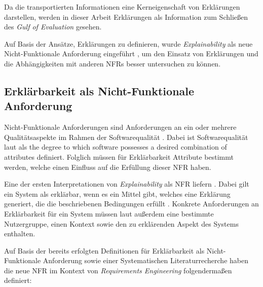 Da die transportierten Informationen eine Kerneigenschaft von Erklärungen darstellen, werden in dieser Arbeit Erklärungen als Information zum Schließen des \textit{Gulf of Evaluation} \cite{norman1988psychology} gesehen.

Auf Basis der Ansätze, Erklärungen zu definieren, wurde \textit{Explainability} als neue Nicht-Funktionale Anforderung eingeführt \cite{kohl_explainability_2019}, um den Einsatz von Erklärungen und die Abhängigkeiten mit anderen NFRs besser untersuchen zu können.

\subsection{Erklärbarkeit als Nicht-Funktionale Anforderung}
\label{02_basics:explainability}

Nicht-Funktionale Anforderungen sind Anforderungen an ein oder mehrere Qualitätsaspekte im Rahmen der Softwarequalität \cite{chung2009non,schneider2012abenteuer}. Dabei ist Softwarequalität laut  als \glqq [...] the degree to which software possesses a desired combination of attributes\grqq{}\cite{international1992ieee} definiert. Folglich müssen für Erklärbarkeit Attribute bestimmt werden, welche einen Einfluss auf die Erfüllung dieser NFR haben.

Eine der ersten Interpretationen von \textit{Explainability} als NFR liefern \citeauthor{kohl_explainability_2019}. Dabei gilt ein System als erklärbar, wenn es ein Mittel gibt, welches eine Erklärung generiert, die die beschriebenen Bedingungen erfüllt \cite{kohl_explainability_2019}. Konkrete Anforderungen an Erklärbarkeit für ein System müssen laut \citeauthor{kohl_explainability_2019} außerdem eine bestimmte Nutzergruppe, einen Kontext sowie den zu erklärenden Aspekt des Systems enthalten.

Auf Basis der bereits erfolgten Definitionen für Erklärbarkeit als Nicht-Funktionale Anforderung sowie einer Systematischen Literaturrecherche haben \citeauthor{chazette_knowledge_nodate} die neue NFR im Kontext von \textit{Requirements Engineering} folgendermaßen definiert:

\smallskip

\noindent{}

